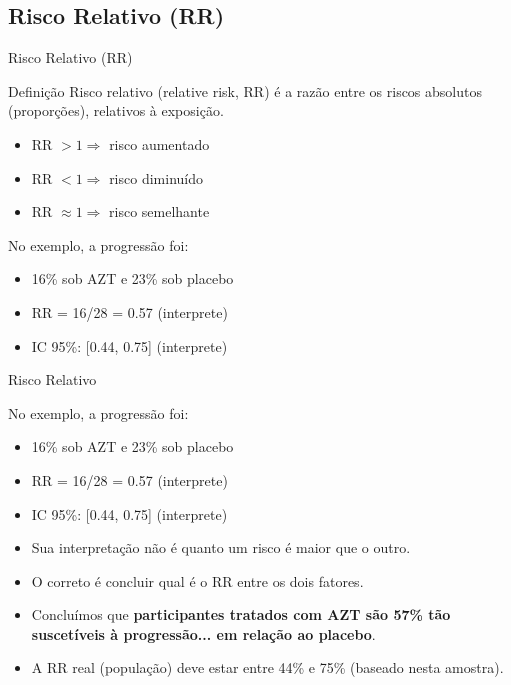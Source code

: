 \documentclass{beamer}
\begin{document}
\subsection{Risco Relativo (RR)}

\begin{frame}{Risco Relativo (RR)}
  \begin{block}{Definição}
    Risco relativo (relative risk, RR) é a razão entre os riscos absolutos (proporções), relativos à exposição.
  \end{block}
  \begin{itemize}
  \item RR $> 1 \Rightarrow$ risco aumentado
  \item RR $< 1 \Rightarrow$ risco diminuído
  \item RR $\approx 1 \Rightarrow$ risco semelhante
  \end{itemize}
  \begin{exampleblock}{No exemplo, a progressão foi:}
    \begin{itemize}
    \item 16\% sob AZT e 23\% sob placebo
    \item RR = 16/28 = 0.57 (interprete)
    \item<2-> IC 95\%: [0.44, 0.75] (interprete)
    \end{itemize}
  \end{exampleblock}
\end{frame}

\begin{frame}{Risco Relativo}
  \begin{exampleblock}{No exemplo, a progressão foi:}
    \begin{itemize}
    \item 16\% sob AZT e 23\% sob placebo
    \item RR = 16/28 = 0.57 (interprete)
    \item IC 95\%: [0.44, 0.75] (interprete)
    \end{itemize}
  \end{exampleblock}
  \begin{itemize}
  \item Sua interpretação \alert{não é} quanto um risco é maior que o outro.
  \item O correto é concluir qual é o RR \alert{entre} os dois fatores.
  \item Concluímos que {\bf participantes tratados com AZT são 57\% tão suscetíveis à progressão... em relação ao placebo}.
  \item A RR real (população) deve estar entre 44\% e 75\% (baseado nesta amostra).
  \end{itemize}
\end{frame}
\end{document}
